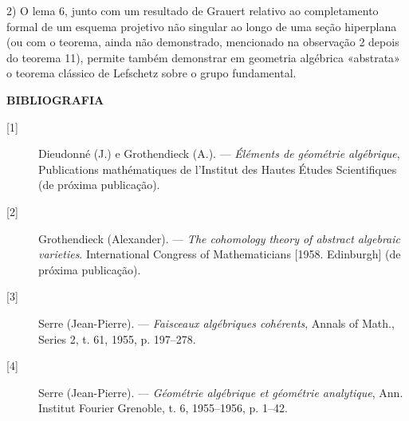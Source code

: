 2) O lema 6, junto com um resultado de Grauert relativo ao completamento
formal de um esquema projetivo não singular ao longo de uma seção
hiperplana (ou com o teorema, ainda não demonstrado, mencionado na
observação 2 depois do teorema 11), permite também demonstrar em geometria
algébrica «abstrata» o teorema clássico de Lefschetz sobre o grupo
fundamental.

\begin{center}
  \textbf{BIBLIOGRAFIA}
\end{center}

\begin{description}
  \item[{[1]}] Dieudonné (J.) e Grothendieck (A.). --- \emph{Éléments de
    géométrie algébrique}, Publications mathématiques de l'Institut des Hautes
    Études Scientifiques (de próxima publicação).
  \item[{[2]}] Grothendieck (Alexander). --- \emph{The cohomology theory of
    abstract algebraic varieties}. International Congress of Mathematicians
    [1958. Edinburgh] (de próxima publicação).
  \item[{[3]}] Serre (Jean-Pierre). --- \emph{Faisceaux algébriques
    cohérents}, Annals of Math., Series 2, t. 61, 1955, p. 197--278.
  \item[{[4]}] Serre (Jean-Pierre). --- \emph{Géométrie algébrique et
    géométrie analytique}, Ann. Institut Fourier Grenoble, t. 6, 1955--1956,
    p. 1--42.
\end{description}
